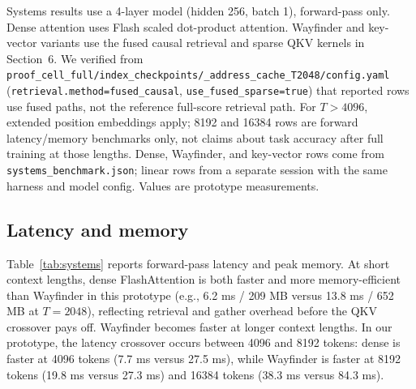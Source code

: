 \documentclass{article}
\begin{document}
Systems results use a 4-layer model (hidden 256, batch 1), forward-pass only. Dense attention uses Flash scaled dot-product attention. Wayfinder and key-vector variants use the fused causal retrieval and sparse QKV kernels in Section~6. We verified from \texttt{proof\_cell\_full/index\_checkpoints/\_address\_cache\_T2048/config.yaml} (\texttt{retrieval.method=fused\_causal}, \texttt{use\_fused\_sparse=true}) that reported rows use fused paths, not the reference full-score retrieval path. For $T>4096$, extended position embeddings apply; 8192 and 16384 rows are forward latency/memory benchmarks only, not claims about task accuracy after full training at those lengths. Dense, Wayfinder, and key-vector rows come from \texttt{systems\_benchmark.json}; linear rows from a separate session with the same harness and model config. Values are prototype measurements.

\subsection{Latency and memory}

Table~\ref{tab:systems} reports forward-pass latency and peak memory. At short context lengths, dense FlashAttention is both faster and more memory-efficient than Wayfinder in this prototype (e.g., 6.2 ms / 209 MB versus 13.8 ms / 652 MB at $T{=}2048$), reflecting retrieval and gather overhead before the QKV crossover pays off. Wayfinder becomes faster at longer context lengths. In our prototype, the latency crossover occurs between 4096 and 8192 tokens: dense is faster at 4096 tokens (7.7 ms versus 27.5 ms), while Wayfinder is faster at 8192 tokens (19.8 ms versus 27.3 ms) and 16384 tokens (38.3 ms versus 84.3 ms).

\begin{table}[H]
\caption{Forward-pass systems benchmark, 4-layer model, batch size 1, sparse forward $K=128$ for Wayfinder and key-vector. Values are latency / peak VRAM. Dense, Wayfinder, and key-vector rows are from the canonical proof-cell benchmark; linear rows are from a separate run of the same harness.}
\centering
\small
{}
\label{tab:systems}
\end{table}
\end{document}
